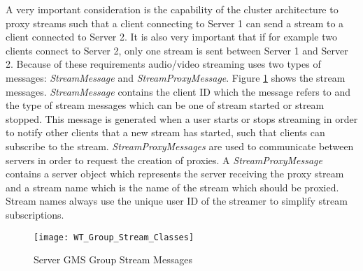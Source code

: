 A very important consideration is the capability of the cluster architecture to proxy streams such that a client connecting to Server 1 can send a stream to a client connected to Server 2. It is also very important that if for example two clients connect to Server 2, only one stream is sent between Server 1 and Server 2. Because of these requirements audio/video streaming uses two types of messages: \textit{StreamMessage} and \textit{StreamProxyMessage}. Figure \ref{fig:groupstreammsg} shows the stream messages. \textit{StreamMessage} contains the client ID which the message refers to and the type of stream messages which can be one of stream started or stream stopped. This message is generated when a user starts or stops streaming in order to notify other clients that a new stream has started, such that clients can subscribe to the stream. \textit{StreamProxyMessages} are used to communicate between servers in order to request the creation of proxies. A \textit{StreamProxyMessage} contains a server object which represents the server receiving the proxy stream and a stream name which is the name of the stream which should be proxied. Stream names always use the unique user ID of the streamer to simplify stream subscriptions.

\begin{figure}
	\centering
	\texttt{[image: WT\_Group\_Stream\_Classes]}
	\caption{Server GMS Group Stream Messages}
	\label{fig:groupstreammsg}
\end{figure}

